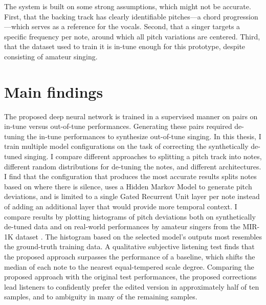 The system is built on some strong assumptions, which might not be accurate. First, that the backing track has clearly identifiable pitches---a chord progression---which serves as a reference for the vocals. Second, that a singer targets a specific frequency per note, around which all pitch variations are centered. Third, that the dataset used to train it is in-tune enough for this prototype, despite consisting of amateur singing. %
\section{Main findings}
The proposed deep neural network is trained in a supervised manner on pairs on in-tune versus out-of-tune performances. Generating these pairs required de-tuning the in-tune performances to synthesize out-of-tune singing. In this thesis, I train multiple model configurations on the task of correcting the synthetically de-tuned singing. I compare different approaches to splitting a pitch track into notes, different random distributions for de-tuning the notes, and different architectures. I find that the configuration that produces the most accurate results splits notes based on where there is silence, uses a Hidden Markov Model \cite{rabiner1989tutorial} to generate pitch deviations, and is limited to a single Gated Recurrent Unit \cite{chung2014empirical} layer per note instead of adding an additional layer that would provide more temporal context. I compare results by plotting histograms of pitch deviations both on synthetically de-tuned data and on real-world performances by amateur singers from the MIR-1K dataset \cite{hsu2009improvement}. The histogram based on the selected model's outputs most resembles the ground-truth training data. A qualitative subjective listening test finds that the proposed approach surpasses the performance of a baseline, which shifts the median of each note to the nearest equal-tempered scale degree. Comparing the proposed approach with the original test performances, the proposed corrections lead listeners to confidently prefer the edited version in approximately half of ten samples, and to ambiguity in many of the remaining samples.

